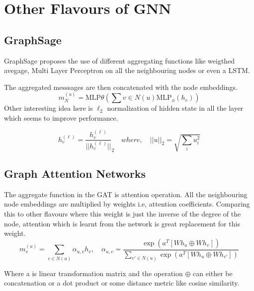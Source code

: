 \section{Other Flavours of GNN}


\subsection{GraphSage}
GraphSage proposes the use of different aggregating functions like weigthed avegage, Multi Layer Perceptron on all the neighbouring nodes or even a LSTM.

The aggregated messsages are then concatenated with the node embeddings.
\begin{displaymath}
    m_N^{(u)} = \text{MLP}{\theta} \left( \sum{v \in N(u)} \text{MLP}_{\phi}(h_v)\right)
\end{displaymath}
Other interesting idea here is $\ell_2$ normalization of hidden state in all the layer which seems to improve performance.

\begin{displaymath}
    h_v^{(\ell)} = \frac{h_v^{(\ell)}}{||h_v^{(\ell)}||}_2 \quad where, \quad ||u||_2 = \sqrt{\sum_i u_i^2}
\end{displaymath}

\subsection{Graph Attention Networks}
The aggregate function in the GAT is attention operation. All the neighbouring node embeddings are multiplied by weights i.e, attention coefficients. Comparing this to other flavours where this weight is just the inverse of the degree of the node, attention which is learnt from the network is great replacement for this weight.
\begin{displaymath}
m_v^{(u)} = \sum_{v \in N(u)} \alpha_{u,v} h_v,  \quad \alpha_{u,v} = \frac{\exp(a^T [Wh_u \oplus Wh_v])}{\sum_{v' \in N(u)} {\exp(a^T [W{h_u} \oplus Wh_{v'}])}}
\end{displaymath}

Where a is linear transformation matrix and the operation $\oplus$ can either be concatenation or a dot product or some distance metric like cosine similarity.

